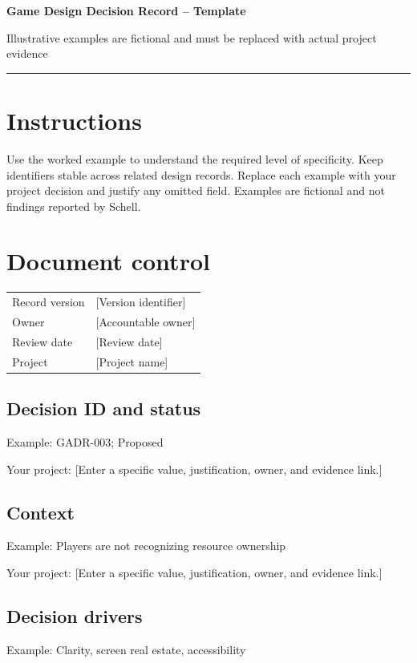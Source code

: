 \documentclass[11pt]{article}
\begin{document}
{\huge\bfseries\color{suiteblue} Game Design Decision Record -- Template}\par
\vspace{0.15in}
{\normalsize\color{suitegray} Illustrative examples are fictional and must be replaced with actual project evidence}\par
\vspace{0.15in}\hrule\vspace{0.15in}

\section{Instructions}
Use the worked example to understand the required level of specificity. Keep identifiers stable across related design records. Replace each example with your project decision and justify any omitted field. Examples are fictional and not findings reported by Schell.


\section{Document control}
\begin{tabularx}{\linewidth}{@{}lX@{}}\toprule Record version & [Version identifier]\\ Owner & [Accountable owner]\\ Review date & [Review date]\\ Project & [Project name]\\\bottomrule\end{tabularx}

\subsection{Decision ID and status}
Example: GADR-003; Proposed

Your project: [Enter a specific value, justification, owner, and evidence link.]


\subsection{Context}
Example: Players are not recognizing resource ownership

Your project: [Enter a specific value, justification, owner, and evidence link.]


\subsection{Decision drivers}
Example: Clarity, screen real estate, accessibility
\end{document}
